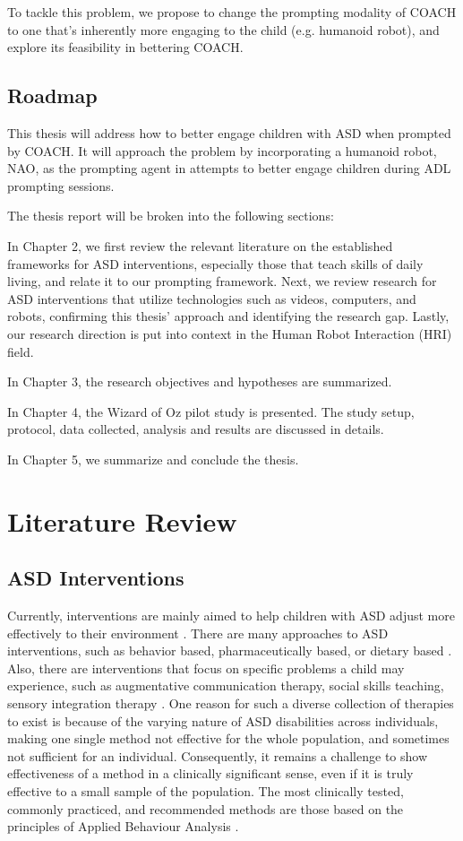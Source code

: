 \documentclass{ut-thesis}
\begin{document}
To tackle this problem, we propose to change the prompting modality of COACH to one that's inherently more engaging to the child (e.g. humanoid robot), and explore its feasibility in bettering COACH.

\section{Roadmap}

This thesis will address how to better engage children with ASD when prompted by COACH.  It will approach the problem by incorporating a humanoid robot, NAO, as the prompting agent in attempts to better engage children during ADL prompting sessions.


The thesis report will be broken into the following sections:


In Chapter 2, we first review the relevant literature on the established frameworks for ASD interventions, especially those that teach skills of daily living, and relate it to our prompting framework.  Next, we review research for ASD interventions that utilize technologies such as videos, computers, and robots, confirming this thesis' approach and identifying the research gap.  Lastly, our research direction is put into context in the Human Robot Interaction (HRI) field.


In Chapter 3, the research objectives and hypotheses are summarized.

In Chapter 4, the Wizard of Oz pilot study is presented.  The study setup, protocol, data collected, analysis and results are discussed in details.

In Chapter 5, we summarize and conclude the thesis.




\chapter{Literature Review}

\section{ASD Interventions}

Currently, interventions are mainly aimed to help children with ASD adjust more effectively to their environment \cite{francis2005autism}.  There are many approaches to ASD interventions, such as behavior based, pharmaceutically based, or dietary based \cite{francis2005autism}.  Also, there are interventions that focus on specific problems a child may experience, such as augmentative communication therapy, social skills teaching, sensory integration therapy \cite{francis2005autism}.  One reason for such a diverse collection of therapies to exist is because of the varying nature of ASD disabilities across individuals, making one single method not effective for the whole population, and sometimes not sufficient for an individual.  Consequently, it remains a challenge to show effectiveness of a method in a clinically significant sense, even if it is truly effective to a small sample of the population.  The most clinically tested, commonly practiced, and recommended methods are those based on the principles of Applied Behaviour Analysis \cite{foxx2008applied}.
\end{document}
